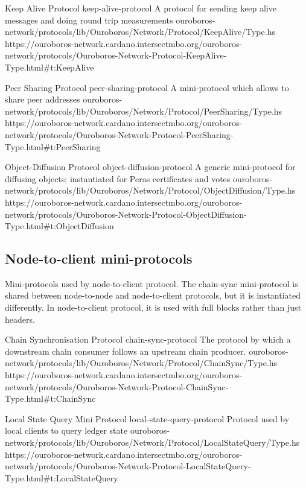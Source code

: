 \miniEntry
    {Keep Alive Protocol}
    {keep-alive-protocol}
    {A protocol for sending keep alive messages and doing round trip measurements}
    {ouroboros-network/protocols/lib/Ouroboros/Network/Protocol/KeepAlive/Type.hs}
    {https://ouroboros-network.cardano.intersectmbo.org/ouroboros-network/protocols/Ouroboros-Network-Protocol-KeepAlive-Type.html\#t:KeepAlive}

\miniEntry
    {Peer Sharing Protocol}
    {peer-sharing-protocol}
    {A mini-protocol which allows to share peer addresses}
    {ouroboros-network/protocols/lib/Ouroboros/Network/Protocol/PeerSharing/Type.hs}
    {https://ouroboros-network.cardano.intersectmbo.org/ouroboros-network/protocols/Ouroboros-Network-Protocol-PeerSharing-Type.html\#t:PeerSharing}

\miniEntry
    {Object-Diffusion Protocol}
    {object-diffusion-protocol}
    {A generic mini-protocol for diffusing objects; instantiated for Peras certificates and votes}
    {ouroboros-network/protocols/lib/Ouroboros/Network/Protocol/ObjectDiffusion/Type.hs}
    {https://ouroboros-network.cardano.intersectmbo.org/ouroboros-network/protocols/Ouroboros-Network-Protocol-ObjectDiffusion-Type.html\#t:ObjectDiffusion}

\subsection{Node-to-client mini-protocols}

Mini-protocols used by node-to-client protocol.  The chain-sync mini-protocol
is shared between node-to-node and node-to-client protocols, but it is instantiated differently.  In
node-to-client protocol, it is used with full blocks rather than just headers.

\miniEntry
    {Chain Synchronisation Protocol}
    {chain-sync-protocol}
    {The protocol by which a downstream chain consumer follows an upstream chain producer.}
    {ouroboros-network/protocols/lib/Ouroboros/Network/Protocol/ChainSync/Type.hs}
    {https://ouroboros-network.cardano.intersectmbo.org/ouroboros-network/protocols/Ouroboros-Network-Protocol-ChainSync-Type.html\#t:ChainSync}

\miniEntry
    {Local State Query Mini Protocol}
    {local-state-query-protocol}
    {Protocol used by local clients to query ledger state}
    {ouroboros-network/protocols/lib/Ouroboros/Network/Protocol/LocalStateQuery/Type.hs}
    {https://ouroboros-network.cardano.intersectmbo.org/ouroboros-network/protocols/Ouroboros-Network-Protocol-LocalStateQuery-Type.html\#t:LocalStateQuery}

